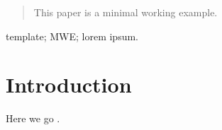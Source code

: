 \documentclass[conference,a4paper]{cs-techrep} %
\begin{document}
\selectlanguage{\cstechrepLang}
\maketitle
\begin{abstract}
This paper is a minimal working example.
\end{abstract}
\begin{IEEEkeywords}
template; MWE; lorem ipsum.
\end{IEEEkeywords}

\section{Introduction}
Here we go \cite{article-full}.

\printbibliography[notcategory=selfref]
\end{document}
